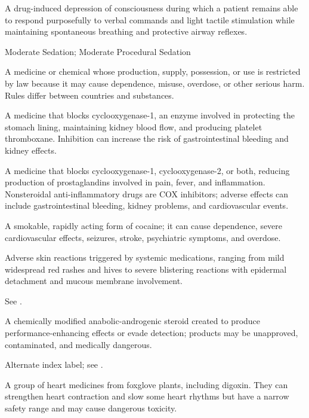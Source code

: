  A drug-induced depression of consciousness during which a patient remains able to respond purposefully to verbal commands and light tactile stimulation while maintaining spontaneous breathing and protective airway reflexes.

\synonyms
Moderate Sedation; Moderate Procedural Sedation

 A medicine or chemical whose production, supply, possession, or use is restricted by law because it may cause dependence, misuse, overdose, or other serious harm. Rules differ between countries and substances.

 A medicine that blocks cyclooxygenase-1, an enzyme involved in protecting the stomach lining, maintaining kidney blood flow, and producing platelet thromboxane. Inhibition can increase the risk of gastrointestinal bleeding and kidney effects.

 A medicine that blocks cyclooxygenase-1, cyclooxygenase-2, or both, reducing production of prostaglandins involved in pain, fever, and inflammation. Nonsteroidal anti-inflammatory drugs are COX inhibitors; adverse effects can include gastrointestinal bleeding, kidney problems, and cardiovascular events.

 A smokable, rapidly acting form of cocaine; it can cause dependence, severe cardiovascular effects, seizures, stroke, psychiatric symptoms, and overdose.

 Adverse skin reactions triggered by systemic medications, ranging from mild widespread red rashes and hives to severe blistering reactions with epidermal detachment and mucous membrane involvement.

 See .


 A chemically modified anabolic-androgenic steroid created to produce performance-enhancing effects or evade detection; products may be unapproved, contaminated, and medically dangerous.

 Alternate index label; see .


 A group of heart medicines from foxglove plants, including digoxin. They can strengthen heart contraction and slow some heart rhythms but have a narrow safety range and may cause dangerous toxicity.

